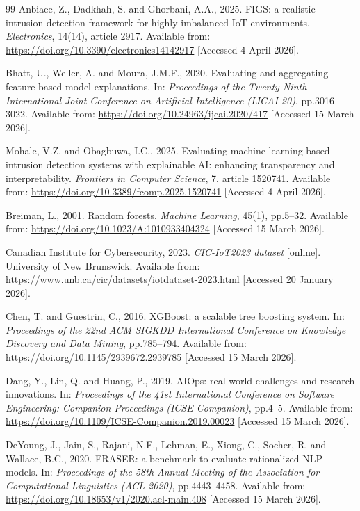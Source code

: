 \documentclass[12pt,a4paper]{report}
\begin{document}
\begin{thebibliography}{99}
Anbiaee, Z., Dadkhah, S. and Ghorbani, A.A., 2025. FIGS: a realistic intrusion-detection framework for highly imbalanced IoT environments. \textit{Electronics}, 14(14), article 2917. Available from: \url{https://doi.org/10.3390/electronics14142917} [Accessed 4 April 2026].

Bhatt, U., Weller, A. and Moura, J.M.F., 2020. Evaluating and aggregating feature-based model explanations. In: \textit{Proceedings of the Twenty-Ninth International Joint Conference on Artificial Intelligence (IJCAI-20)}, pp.3016--3022. Available from: \url{https://doi.org/10.24963/ijcai.2020/417} [Accessed 15 March 2026].

Mohale, V.Z. and Obagbuwa, I.C., 2025. Evaluating machine learning-based intrusion detection systems with explainable AI: enhancing transparency and interpretability. \textit{Frontiers in Computer Science}, 7, article 1520741. Available from: \url{https://doi.org/10.3389/fcomp.2025.1520741} [Accessed 4 April 2026].

Breiman, L., 2001. Random forests. \textit{Machine Learning}, 45(1), pp.5--32. Available from: \url{https://doi.org/10.1023/A:1010933404324} [Accessed 15 March 2026].

Canadian Institute for Cybersecurity, 2023. \textit{CIC-IoT2023 dataset} [online]. University of New Brunswick. Available from: \url{https://www.unb.ca/cic/datasets/iotdataset-2023.html} [Accessed 20 January 2026].

Chen, T. and Guestrin, C., 2016. XGBoost: a scalable tree boosting system. In: \textit{Proceedings of the 22nd ACM SIGKDD International Conference on Knowledge Discovery and Data Mining}, pp.785--794. Available from: \url{https://doi.org/10.1145/2939672.2939785} [Accessed 15 March 2026].

Dang, Y., Lin, Q. and Huang, P., 2019. AIOps: real-world challenges and research innovations. In: \textit{Proceedings of the 41st International Conference on Software Engineering: Companion Proceedings (ICSE-Companion)}, pp.4--5. Available from: \url{https://doi.org/10.1109/ICSE-Companion.2019.00023} [Accessed 15 March 2026].

DeYoung, J., Jain, S., Rajani, N.F., Lehman, E., Xiong, C., Socher, R. and Wallace, B.C., 2020. ERASER: a benchmark to evaluate rationalized NLP models. In: \textit{Proceedings of the 58th Annual Meeting of the Association for Computational Linguistics (ACL 2020)}, pp.4443--4458. Available from: \url{https://doi.org/10.18653/v1/2020.acl-main.408} [Accessed 15 March 2026].


\end{thebibliography}
\end{document}

